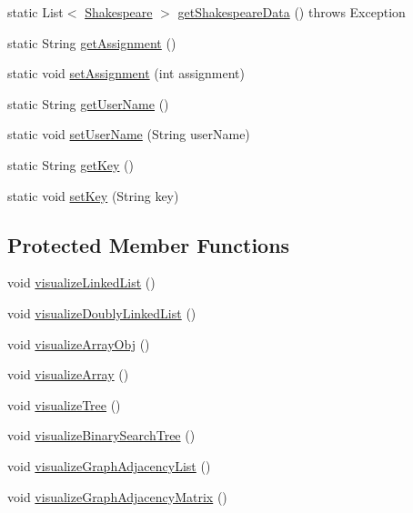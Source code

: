 \begin{DoxyCompactItemize}
static List$<$ \hyperlink{classbridges_1_1data__src__dependent_1_1_shakespeare}{Shakespeare} $>$ \hyperlink{classbridges_1_1connect_1_1_bridges_a03ba87a09742cfb40f357253239006e6}{get\+Shakespeare\+Data} ()  throws Exception 
\item 
static String \hyperlink{classbridges_1_1connect_1_1_bridges_ae488b9bf0d696adb7f5a6ba7ce4ff2fd}{get\+Assignment} ()
\item 
static void \hyperlink{classbridges_1_1connect_1_1_bridges_a24c91901a59ab8b715a864ab8a4d9cdc}{set\+Assignment} (int assignment)
\item 
static String \hyperlink{classbridges_1_1connect_1_1_bridges_a5ff3fdd97d4c71c9c2141c3355e417aa}{get\+User\+Name} ()
\item 
static void \hyperlink{classbridges_1_1connect_1_1_bridges_a2d84103645662308e58a1b473d3320ae}{set\+User\+Name} (String user\+Name)
\item 
static String \hyperlink{classbridges_1_1connect_1_1_bridges_a813a1783f7b547fdb964f8af87c66f4b}{get\+Key} ()
\item 
static void \hyperlink{classbridges_1_1connect_1_1_bridges_a484992ce3fce273ca2caa215a4488e3c}{set\+Key} (String key)
\end{DoxyCompactItemize}
\subsection*{Protected Member Functions}
\begin{DoxyCompactItemize}
\item 
void \hyperlink{classbridges_1_1connect_1_1_bridges_ae9ce2673d2eef1da7f6e1359c494f6fe}{visualize\+Linked\+List} ()
\item 
void \hyperlink{classbridges_1_1connect_1_1_bridges_ac1ac1db8cf7123aefb83ab05af83375d}{visualize\+Doubly\+Linked\+List} ()
\item 
void \hyperlink{classbridges_1_1connect_1_1_bridges_a7533ebb339527a3a824fc7af21a1d5c9}{visualize\+Array\+Obj} ()
\item 
void \hyperlink{classbridges_1_1connect_1_1_bridges_ac4e90699b288fcfbaf19e59bc4dbafb3}{visualize\+Array} ()
\item 
void \hyperlink{classbridges_1_1connect_1_1_bridges_abd8fa1ef8d6c5d3e6c533ee069d24d85}{visualize\+Tree} ()
\item 
void \hyperlink{classbridges_1_1connect_1_1_bridges_a283d29561d78a890f01c8735c18d17d0}{visualize\+Binary\+Search\+Tree} ()
\item 
void \hyperlink{classbridges_1_1connect_1_1_bridges_a7470f7a358eee6a6cded3ab42f8b9cdc}{visualize\+Graph\+Adjacency\+List} ()
\item 
void \hyperlink{classbridges_1_1connect_1_1_bridges_a13c154c2a656dd4c19f2ff0e767f63c3}{visualize\+Graph\+Adjacency\+Matrix} ()
\end{DoxyCompactItemize}
